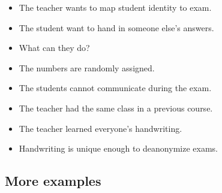 \begin{frame}
  \begin{remark}[Adversaries]
    \begin{itemize}
      \item The teacher wants to map student identity to exam.
      \item The student want to hand in someone else's answers.
    \end{itemize}
  \end{remark}

  \begin{question}
    \begin{itemize}
      \item What can they do?
    \end{itemize}
  \end{question}
\end{frame}

\begin{frame}
  \begin{remark}[Assumptions]
    \begin{itemize}
      \item The numbers are randomly assigned.
      \item The students cannot communicate during the exam.
    \end{itemize}
  \end{remark}
\end{frame}

\begin{frame}
  \begin{remark}
    \begin{itemize}
      \item The teacher had the same class in a previous course.
      \item The teacher learned everyone's handwriting.
      \item Handwriting is unique enough to deanonymize exams.
    \end{itemize}
  \end{remark}
\end{frame}

\subsection{More examples}

